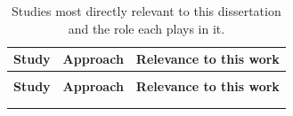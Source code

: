 \documentclass[MScCS]{uccthesis}
\begin{document}
\begingroup
\small
\setlength{\tabcolsep}{4pt}
\begin{xltabular}{\textwidth}{@{}>{\raggedright\arraybackslash}p{3.4cm}
                                 >{\raggedright\arraybackslash}p{3.6cm}
                                 >{\raggedright\arraybackslash}X@{}}
\caption[Studies most relevant to this dissertation.]
        {Studies most directly relevant to this dissertation and the role each
         plays in it.}\label{tab:related}\\
\toprule
\textbf{Study} & \textbf{Approach} & \textbf{Relevance to this work} \\
\midrule
\endfirsthead

\\
\toprule
\textbf{Study} & \textbf{Approach} & \textbf{Relevance to this work} \\
\midrule
\endhead

\midrule
{}\\
\endfoot

\bottomrule
\endlastfoot


\end{xltabular}
\end{document}
